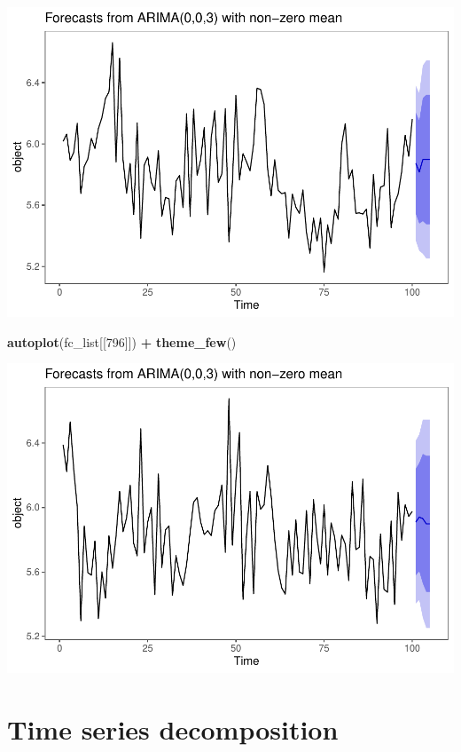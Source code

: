 \documentclass[11pt, a4paper]{report}
\newenvironment{Shaded}{\begin{snugshade}}{\end{snugshade}}
\newcommand{\DecValTok}[1]{\textcolor[rgb]{0.00,0.00,0.81}{#1}}
\newcommand{\KeywordTok}[1]{\textcolor[rgb]{0.13,0.29,0.53}{\textbf{#1}}}
\newcommand{\NormalTok}[1]{#1}
\newcommand{\OperatorTok}[1]{\textcolor[rgb]{0.81,0.36,0.00}{\textbf{#1}}}
\newcommand{\StringTok}[1]{\textcolor[rgb]{0.31,0.60,0.02}{#1}}
\theoremstyle{plain}
\theoremstyle{plain}
\theoremstyle{remark}
\begin{document}
\begin{center}\includegraphics{Econo2_P4_files/figure-latex/forecast arima plots-3} \end{center}

\begin{Shaded}
	\begin{Highlighting}[]
		\KeywordTok{autoplot}\NormalTok{(fc_list[[}\DecValTok{796}\NormalTok{]]) }\OperatorTok{+}\StringTok{ }\KeywordTok{theme_few}\NormalTok{()}
	\end{Highlighting}
\end{Shaded}

\begin{center}\includegraphics{Econo2_P4_files/figure-latex/forecast arima plots-4} \end{center}


\chapter{Time series decomposition}
\end{document}

